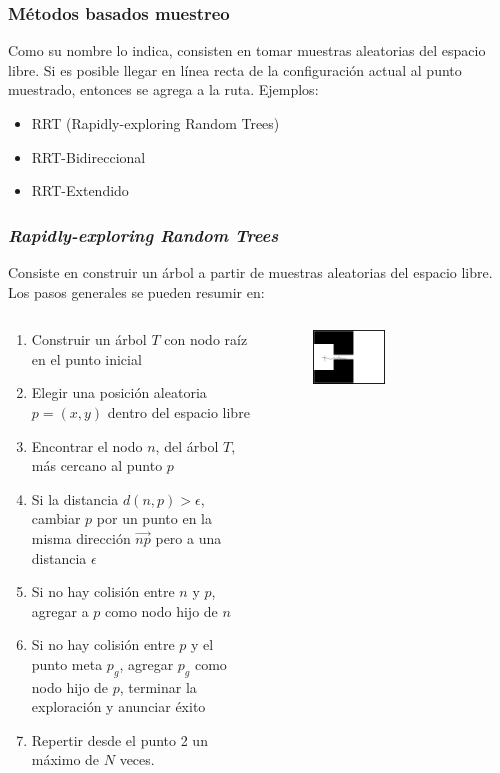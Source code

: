 \begin{frame}\frametitle{Métodos basados muestreo}
  Como su nombre lo indica, consisten en tomar muestras aleatorias del espacio libre. Si es posible llegar en línea recta de la configuración actual al punto muestrado, entonces se agrega a la ruta.
  Ejemplos:
  \begin{itemize}
  \item RRT (Rapidly-exploring Random Trees)
  \item RRT-Bidireccional
  \item RRT-Extendido
  \end{itemize}
\end{frame}

\begin{frame}\frametitle{\textit{Rapidly-exploring Random Trees}}
  Consiste en construir un árbol a partir de muestras aleatorias del espacio libre. Los pasos generales se pueden resumir en:
  \begin{columns}
    \begin{column}{0.55\textwidth}
      \begin{enumerate}
      \item Construir un árbol $T$ con nodo raíz en el punto inicial
      \item Elegir una posición aleatoria $p=(x,y)$ dentro del espacio libre
      \item Encontrar el nodo $n$, del árbol $T$, más cercano al punto $p$
      \item Si la distancia $d(n, p) > \epsilon$, cambiar $p$ por un punto en la misma dirección $\overrightarrow{np}$ pero a una distancia $\epsilon$
      \item Si no hay colisión entre $n$ y $p$, agregar a $p$ como nodo hijo de $n$
      \item Si no hay colisión entre $p$ y el punto meta $p_g$, agregar $p_g$ como nodo hijo de $p$, terminar la exploración y anunciar éxito
      \item Repertir desde el punto 2 un máximo de $N$ veces.
      \end{enumerate}
    \end{column}
    \begin{column}{0.45\textwidth}
      \begin{figure}
        \centering
        \includegraphics[width=0.45\textwidth]{Figures/MotionPlanning/RRTO010.png}

\end{figure}
\end{column}
\end{columns}
\end{frame}
